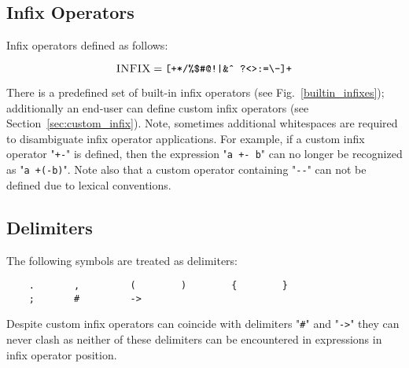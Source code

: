 \subsection{Infix Operators}

Infix operators defined as follows:

\[
\textsc{INFIX}=\mbox{\texttt{[+*/\%\$\#@!|\&\^{}~?<>:=\textbackslash-]+}}
\]

There is a predefined set of built-in infix operators (see Fig.~\ref{builtin_infixes}); additionally
an end-user can define custom infix operators (see Section~\ref{sec:custom_infix}). Note, sometimes 
additional whitespaces are required to disambiguate infix operator applications. For example, if a
custom infix operator "\lstinline|+-|" is defined, then the expression "\lstinline|a +- b|" can no longer be
recognized as "\lstinline|a +(-b)|". Note also that a custom operator containing "\lstinline|--|" can not be
defined due to lexical conventions.

\subsection{Delimiters}

The following symbols are treated as delimiters:

\begin{lstlisting}
    .       ,         (        )        {        }
    ;       #         ->
\end{lstlisting}

Despite custom infix operators can coincide with delimiters "\lstinline|#|" and "\lstinline|->|" they can
never clash as neither of these delimiters can be encountered in expressions in infix operator position.


